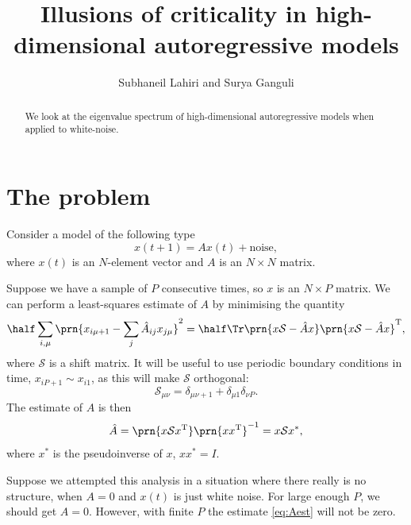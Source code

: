 \documentclass[12pt]{article}
\title{Illusions of criticality in high-dimensional autoregressive models}
\author{Subhaneil Lahiri and Surya Ganguli
%
}
\newcommand{\inv}{^{-1}}
\newcommand{\trans}{^\mathrm{T}}
\newcommand{\shift}{\mathcal{S}}
\newcommand{\aest}{\hat{A}}
\begin{document}
\maketitle




\begin{abstract}
  We look at the eigenvalue spectrum of high-dimensional autoregressive models when applied to white-noise.
\end{abstract}

\tableofcontents


\section{The problem}\label{sec:theprob}

Consider a model of the following type
%
\begin{equation}\label{eq:model}
  x(t+1) = A x(t) + \text{noise},
\end{equation}
%
where $x(t)$ is an $N$-element vector and $A$ is an $N\times N$ matrix.

Suppose we have a sample of $P$ consecutive times, so $x$ is an $N\times P$ matrix.
We can perform a least-squares estimate of $A$ by minimising the quantity
%
\begin{equation}\label{eq:minL}
  \half\sum_{i,\mu} \prn{ x_{i\mu+1} - \sum_j \aest_{ij} x_{j\mu} }^2 = \half\Tr \prn{x\shift-\aest x}\prn{x\shift-\aest x}\trans,
\end{equation}
%
where $\shift$ is a shift matrix.
It will be useful to use periodic boundary conditions in time, \ie $x_{iP+1}\sim x_{i1}$,
as this will make $\shift$ orthogonal:
%
\begin{equation}\label{eq:Udef}
  \shift_{\mu\nu} = \delta_{\mu\nu+1} + \delta_{\mu1}\delta_{\nu P}.
\end{equation}
%
The estimate of $A$ is then
%
\begin{equation}\label{eq:Aest}
  \aest = \prn{x\shift x\trans}\prn{xx\trans}\inv = x\shift x^*,
\end{equation}
%
where $x^*$ is the pseudoinverse of $x$, \ie $xx^*=I$.

Suppose we attempted this analysis in a situation where there really is no structure,
\ie when $A=0$ and $x(t)$ is just white noise.
For large enough $P$, we should get $\aest=0$.
However, with finite $P$ the estimate \eqref{eq:Aest} will not be zero.
\end{document}
